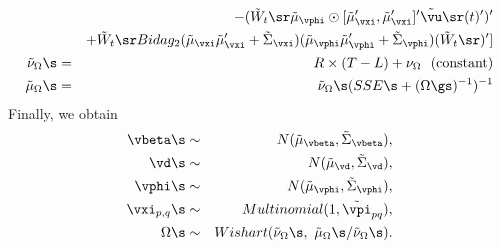 \begin{eqnarray*}
&&- (\tilde{W}_t\sr\tilde{\mu}_{\vphi}\odot [\tilde{\mu}_{\vxi}', \tilde{\mu}_{\vxi}']'\tilde{\vu}\sr(t)')'\\
&& + \tilde{W}_t\sr Bidag_2(\tilde{\mu}_{\vxi}\tilde{\mu}_{\vxi}'+\tilde{\Sigma}_{\vxi})(\tilde{\mu}_{\vphi}\tilde{\mu}_{\vphi}'+\tilde{\Sigma}_{\vphi})(\tilde{W}_t\sr)']\\ 
\tilde{\nu}_{\Omega}\s&=& R\times(T - L) +\nu_{\Omega} ~~\text{(constant)}\\
\tilde{\mu}_{\Omega}\s&=& \tilde{\nu}_{\Omega}\s(SSE\s + (\Omega\gs)^{-1})^{-1}
\end{eqnarray*}
Finally, we obtain 
\begin{eqnarray}
\vbeta\s &\sim& N(\tilde{\mu}_{\vbeta}, \tilde{\Sigma}_{\vbeta}), \\
\vd\s &\sim& N(\tilde{\mu}_{\vd}, \tilde{\Sigma}_{\vd}), \\
\vphi\s &\sim& N(\tilde{\mu}_{\vphi}, \tilde{\Sigma}_{\vphi}), \\
\vxi_{p,q}\s& \sim & Multinomial(1, \tilde{\vpi}_{pq}),\\
\Omega\s &\sim & Wishart(\tilde{\nu}_{\Omega}\s, ~\tilde{\mu}_{\Omega}\s/\tilde{\nu}_{\Omega}\s).
\end{eqnarray}



